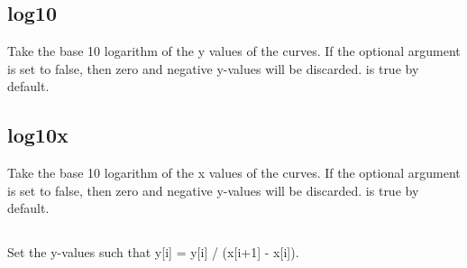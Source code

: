 \documentclass[letterpaper,10pt,english]{sphinxmanual}
\begin{document}
\subsection{log10}
\label{\detokenize{math_operations:log10}}
Take the base 10 logarithm of the y values of the curves. If the optional argument  is set to false, then zero and negative y-values will be discarded.  is true by default.

\begin{sphinxVerbatim}[commandchars=\\\{\}]
\PYG{p}{[}\PYG{p}{]}   \PYG{p}{[}   \PYG{p}{]}
\end{sphinxVerbatim}


\subsection{log10x}
\label{\detokenize{math_operations:log10x}}
Take the base 10 logarithm of the x values of the curves. If the optional argument  is set to false, then zero and negative y-values will be discarded.  is true by default.

\begin{sphinxVerbatim}[commandchars=\\\{\}]
\PYG{p}{[}\PYG{p}{]}   \PYG{p}{[}   \PYG{p}{]}
\end{sphinxVerbatim}


\subsection{}
\label{\detokenize{math_operations:makeintensive-2-4-2}}
Set the y-values such that y{[}i{]} = y{[}i{]} / (x{[}i+1{]} - x{[}i{]}). 

\begin{sphinxVerbatim}[commandchars=\\\{\}]
\PYG{p}{[}\PYG{p}{]}  
\end{sphinxVerbatim}
\end{document}
